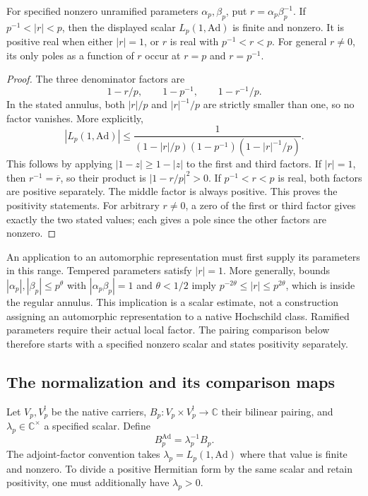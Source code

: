 \begin{lemma}
\label{v4-arith:bcglue-k5:lem:Lp-1-well-defined}
For specified nonzero unramified parameters \(\alpha_p,\beta_p\),
put \(r=\alpha_p\beta_p^{-1}\). If
\(p^{-1}<|r|<p\), then the displayed scalar
\(L_p(1,\mathrm{Ad})\) is finite and nonzero. It is positive real
when either \(|r|=1\), or \(r\) is real with \(p^{-1}<r<p\).
For general \(r\ne0\), its only poles as a function of \(r\) occur
at \(r=p\) and \(r=p^{-1}\).
\end{lemma}

\begin{proof}
The three denominator factors are
\[
 1-r/p,\qquad 1-p^{-1},\qquad 1-r^{-1}/p.
\]
In the stated annulus, both \(|r|/p\) and \(|r|^{-1}/p\) are
strictly smaller than one, so no factor vanishes. More explicitly,
\[
 |L_p(1,\mathrm{Ad})|
 \leq\frac{1}{(1-|r|/p)(1-p^{-1})(1-|r|^{-1}/p)}.
\]
This follows by applying \(|1-z|\geq1-|z|\) to the first and
third factors. If \(|r|=1\), then \(r^{-1}=\overline r\), so their
product is \(|1-r/p|^2>0\). If \(p^{-1}<r<p\) is real, both
factors are positive separately. The middle factor is always positive.
This proves the positivity statements. For arbitrary \(r\ne0\),
a zero of the first or third factor gives exactly the two stated
values; each gives a pole since the other factors are nonzero.
\end{proof}

An application to an automorphic representation must first supply its
parameters in this range. Tempered parameters satisfy \(|r|=1\).
More generally, bounds \(|\alpha_p|,|\beta_p|\leq p^\theta\)
with \(|\alpha_p\beta_p|=1\) and \(\theta<1/2\) imply
\(p^{-2\theta}\leq|r|\leq p^{2\theta}\), which is inside the
regular annulus. This implication is a scalar estimate, not a
construction assigning an automorphic representation to a native
Hochschild class. Ramified parameters require their actual local
factor. The pairing comparison below therefore starts with a
specified nonzero scalar and states positivity separately.

\subsection{The normalization and its comparison maps}

\begin{definition}
\label{v4-arith:bcglue-k5:def:koszul-dual-norm}
Let \(V_p,V_p^!\) be the native carriers, \(B_p:V_p\times V_p^!\to
\mathbb C\) their bilinear pairing, and \(\lambda_p\in\mathbb C^\times\)
a specified scalar. Define
\begin{equation}
             B_p^{\mathrm{Ad}}=\lambda_p^{-1}B_p.
             \label{v4-arith:bcglue-k5:eq:koszul-dual-norm}
\end{equation}
The adjoint-factor convention takes \(\lambda_p=L_p(1,\mathrm{Ad})\)
where that value is finite and nonzero. To divide a positive Hermitian
form by the same scalar and retain positivity, one must additionally
have \(\lambda_p>0\).
\end{definition}

